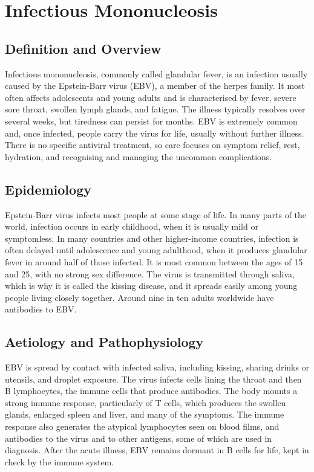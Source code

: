 \chapter{Infectious Mononucleosis}

\section*{Definition and Overview}
Infectious mononucleosis, commonly called glandular fever, is an infection usually caused by the Epstein-Barr virus (EBV), a member of the herpes family. It most often affects adolescents and young adults and is characterised by fever, severe sore throat, swollen lymph glands, and fatigue. The illness typically resolves over several weeks, but tiredness can persist for months. EBV is extremely common and, once infected, people carry the virus for life, usually without further illness. There is no specific antiviral treatment, so care focuses on symptom relief, rest, hydration, and recognising and managing the uncommon complications.

\section*{Epidemiology}
Epstein-Barr virus infects most people at some stage of life. In many parts of the world, infection occurs in early childhood, when it is usually mild or symptomless. In many countries and other higher-income countries, infection is often delayed until adolescence and young adulthood, when it produces glandular fever in around half of those infected. It is most common between the ages of 15 and 25, with no strong sex difference. The virus is transmitted through saliva, which is why it is called the kissing disease, and it spreads easily among young people living closely together. Around nine in ten adults worldwide have antibodies to EBV.

\section*{Aetiology and Pathophysiology}
EBV is spread by contact with infected saliva, including kissing, sharing drinks or utensils, and droplet exposure. The virus infects cells lining the throat and then B lymphocytes, the immune cells that produce antibodies. The body mounts a strong immune response, particularly of T cells, which produces the swollen glands, enlarged spleen and liver, and many of the symptoms. The immune response also generates the atypical lymphocytes seen on blood films, and antibodies to the virus and to other antigens, some of which are used in diagnosis. After the acute illness, EBV remains dormant in B cells for life, kept in check by the immune system.

